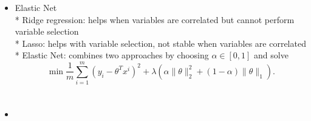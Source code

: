 \documentclass[twoside,12pt]{article}
\begin{document}
\begin{itemize}
\item Elastic Net\\
* Ridge regression: helps when variables are correlated but cannot perform variable selection \\
* Lasso: helps with variable selection, not stable when variables are correlated \\
* Elastic Net: combines two approaches by choosing $\alpha \in [0, 1]$ and solve 
$$\min \frac 1 m \sum_{i=1}^m (y_i - \theta^T x^i)^2 + \lambda (\alpha \|\theta\|_2^2 + (1-\alpha)\|\theta\|_1).$$
\end{itemize}


\section{}
\begin{itemize}
\item
\end{itemize}
\end{document}

